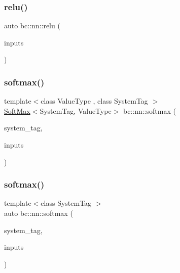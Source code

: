\mbox{\label{namespacebc_1_1nn_a44b0c2822ad51e7b6832ae7305728332}} 
\subsubsection{\texorpdfstring{relu()}{relu()}\hspace{0.1cm}{\footnotesize\ttfamily [5/5]}}
{\footnotesize\ttfamily auto bc\+::nn\+::relu (\begin{DoxyParamCaption}\item[{\hyperlink{namespacebc_aaf8e3fbf99b04b1b57c4f80c6f55d3c5}{bc\+::size\+\_\+t}}]{inputs }\end{DoxyParamCaption})}

\mbox{\label{namespacebc_1_1nn_a02fb410ce3a9154636fa6dd70be6c573}} 
\subsubsection{\texorpdfstring{softmax()}{softmax()}\hspace{0.1cm}{\footnotesize\ttfamily [1/3]}}
{\footnotesize\ttfamily template$<$class Value\+Type , class System\+Tag $>$ \\
\hyperlink{structbc_1_1nn_1_1SoftMax}{Soft\+Max}$<$System\+Tag, Value\+Type$>$ bc\+::nn\+::softmax (\begin{DoxyParamCaption}\item[{System\+Tag}]{system\+\_\+tag,  }\item[{int}]{inputs }\end{DoxyParamCaption})}

\mbox{\label{namespacebc_1_1nn_a59289071157643a5f945692daec05a95}} 
\subsubsection{\texorpdfstring{softmax()}{softmax()}\hspace{0.1cm}{\footnotesize\ttfamily [2/3]}}
{\footnotesize\ttfamily template$<$class System\+Tag $>$ \\
auto bc\+::nn\+::softmax (\begin{DoxyParamCaption}\item[{System\+Tag}]{system\+\_\+tag,  }\item[{int}]{inputs }\end{DoxyParamCaption})}

